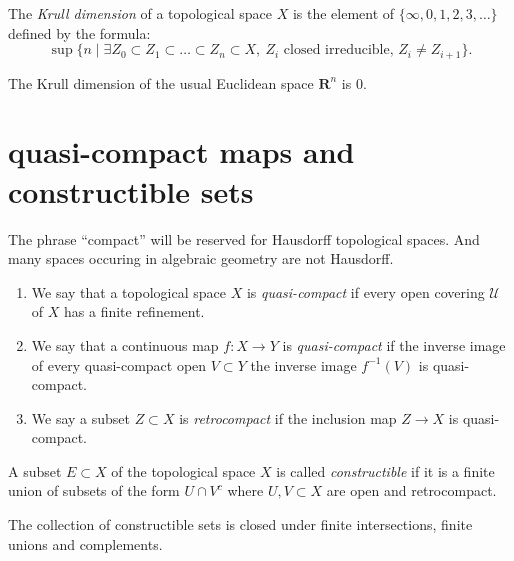 \begin{definition}
\label{definition-Krull}
The {\it Krull dimension} of a topological space $X$ is
the element of $\{\infty,0,1,2,3,\ldots\}$ defined by
the formula:
$$
\sup
\{
n
\mid
\exists Z_0 \subset Z_1 \subset \ldots \subset Z_n \subset X,\ 
Z_i\text{ closed irreducible, }Z_i \not=Z_{i+1}
\}.
$$
\end{definition}

\begin{example}
\label{example-Krull-Rn}
The Krull dimension of the usual Euclidean space
$\mathbf{R}^n$ is $0$.
\end{example}


\section{quasi-compact maps and constructible sets}
\label{section-quasi-compact}

\noindent
The phrase ``compact'' will be reserved
for Hausdorff topological spaces. And many spaces occuring
in algebraic geometry are not Hausdorff.

\begin{definition}
\label{definition-quasi-compact}
\begin{enumerate}
\item We say that a topological space $X$ is {\it quasi-compact}
if every open covering $\mathcal{U}$ of $X$ has a finite
refinement.
\item We say that a continuous map $f : X \to Y$ is {\it quasi-compact}
if the inverse image of every quasi-compact open $V \subset Y$
the inverse image $f^{-1}(V)$ is quasi-compact.
\item We say a subset $Z \subset X$ is {\it retrocompact}
if the inclusion map $Z \to X$ is quasi-compact.
\end{enumerate}
\end{definition}

\begin{definition}
\label{definition-constructible}
A subset $E \subset X$ of the topological space $X$ is called
{\it constructible} if it is a finite union of subsets
of the form $U \cap V^c$ where $U,V \subset X$ are open and
retrocompact.
\end{definition}

\begin{lemma}
\label{lemma-constructible}
The collection of constructible sets is closed under
finite intersections, finite unions and complements.
\end{lemma}

